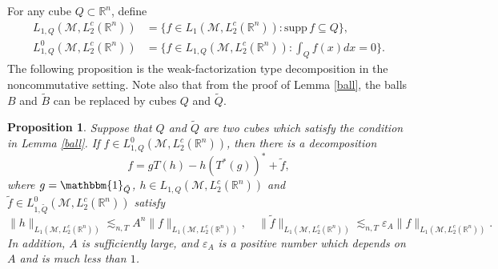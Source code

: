 \documentclass[oneside,english,a4wide]{amsart}
\numberwithin{equation}{section}
\numberwithin{figure}{section}
\theoremstyle{plain}
\theoremstyle{plain}
\newtheorem{proposition}[thm]{Proposition}
\theoremstyle{definition}
\theoremstyle{plain}
\theoremstyle{remark}
\theoremstyle{definition}
\theoremstyle{remark}
\theoremstyle{definition}
\newcommand{\8}{\infty}
\begin{document}
For any cube $Q\subset \mathbb{R}^n$, define
\begin{equation*}
	\begin{aligned}
		L_{1,Q}(\mathcal{M},L_2^c(\mathbb{R}^n))&=\bigg\{f\in L_1(\mathcal{M},L_2^c(\mathbb{R}^n)): \text{supp}\,f\subseteq Q\bigg\},\\
		L^0_{1,Q}(\mathcal{M},L_2^c(\mathbb{R}^n))&=\bigg\{f\in L_{1,Q}(\mathcal{M},L_2^c(\mathbb{R}^n)): \int_Q f(x)dx=0 \bigg\}.
	\end{aligned}
\end{equation*}
The following proposition is the weak-factorization type decomposition in the noncommutative setting. Note also that from the proof of Lemma \ref{ball}, the balls $B$ and $\tilde{B}$ can be replaced by cubes $Q$ and $\tilde{Q}$.
\begin{proposition}\label{nondecom1}
	Suppose that $Q$ and $\tilde{Q}$ are two cubes which satisfy the condition in Lemma \ref{ball}. If $f\in 	L^0_{1,Q}(\mathcal{M},L_2^c(\mathbb{R}^n))$, then there is a decomposition
		\begin{equation*}
			f=gT(h)-h(T^*(g))^*+\tilde{f},
		\end{equation*}
	where $g=\mathbbm{1}_{\tilde{Q}}$, $h\in L_{1,Q}(\mathcal{M},L_2^c(\mathbb{R}^n))$ and $\tilde{f}\in L^0_{1,\tilde{Q}}(\mathcal{M},L_2^c(\mathbb{R}^n))$ satisfy
	\begin{equation*}
		\|h\|_{L_{1}(\mathcal{M},L_2^c(\mathbb{R}^n))}\lesssim_{n,T} A^n\|f\|_{L_{1}(\mathcal{M},L_2^c(\mathbb{R}^n))},\quad \|\tilde{f}\|_{L_{1}(\mathcal{M},L_2^c(\mathbb{R}^n))}\lesssim_{n,T} \varepsilon_A\|f\|_{L_{1}(\mathcal{M},L_2^c(\mathbb{R}^n))}.
	\end{equation*}
    In addition, $A$ is sufficiently large, and $\varepsilon_A$ is a positive number which depends on $A$ and is much less than $1$.
\end{proposition}
\end{document}
